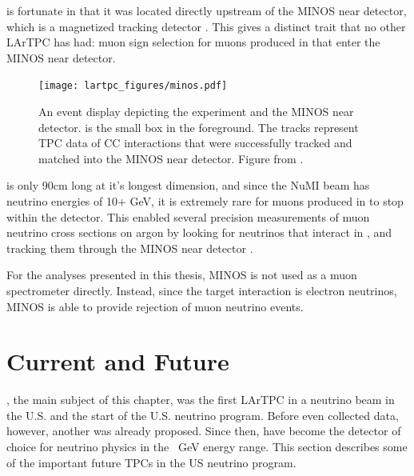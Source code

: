 \argoneut is fortunate in that it was located directly upstream of the MINOS near detector, which is a magnetized tracking detector \cite{Michael:2008bc}.  This gives \argoneut a distinct trait that no other LArTPC has had: muon sign selection for muons produced in \argoneut that enter the MINOS near detector.

\begin{figure}[htb]
  \centering
  \texttt{[image: lartpc\_figures/minos.pdf]}
  \caption[\argoneut and MINOS]{An event display depicting the \argoneut experiment and the MINOS near detector. \argoneut is the small box in the foreground.  The tracks represent TPC data of \numu CC interactions that were successfully tracked and matched into the MINOS near detector.  Figure from \cite{Anderson:2012vc}.}
  \label{fig:minos}
\end{figure}

\argoneut is only 90cm long at it's longest dimension, and since the NuMI beam has neutrino energies of 10+ GeV, it is extremely rare for muons produced in \argoneut to stop within the detector.  This enabled several precision measurements of muon neutrino cross sections on argon by looking for neutrinos that interact in \argoneut, and tracking them through the MINOS near detector \cite{Anderson:2011ce, Acciarri:2014isz}.

For the analyses presented in this thesis, MINOS is not used as a muon spectrometer directly.  Instead, since the target interaction is electron neutrinos, MINOS is able to provide rejection of muon neutrino events.

\FloatBarrier

\section{Current and Future \lartpcs}

\argoneut, the main subject of this chapter, was the first LArTPC in a neutrino beam in the U.S. and the start of the U.S. \lartpc neutrino program.  Before \argoneut even collected data, however, another \lartpc was already proposed.  Since then, \lartpcs have become the detector of choice for neutrino physics in the ~GeV energy range.  This section describes some of the important future TPCs in the US neutrino program. 

\subsection{\label{sec:microboone} \uboone}

